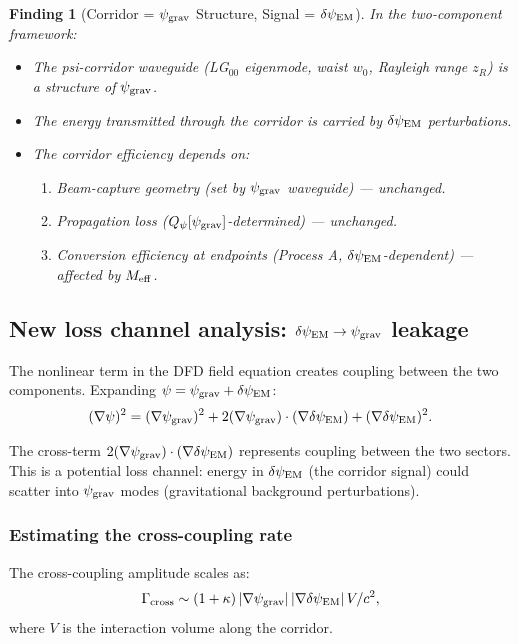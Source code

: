 \documentclass[11pt]{article}
\newtheorem{finding}{Finding}
\newcommand{\psigrav}{\psi_{\rm grav}}
\newcommand{\dpsiEM}{\delta\psi_{\rm EM}}
\newcommand{\Meff}{M_{\rm eff}}
\newcommand{\Qpsi}{Q_\psi}
\begin{document}
\begin{finding}[Corridor = $\psigrav$ Structure, Signal = $\dpsiEM$]
\label{find:corridor-decomposition}
In the two-component framework:
\begin{itemize}[nosep]
  \item The psi-corridor waveguide (LG$_{00}$ eigenmode, waist $w_0$,
    Rayleigh range $z_R$) is a structure of $\psigrav$.
  \item The energy transmitted through the corridor is carried by
    $\dpsiEM$ perturbations.
  \item The corridor efficiency depends on:
    \begin{enumerate}[nosep]
      \item Beam-capture geometry (set by $\psigrav$ waveguide) --- unchanged.
      \item Propagation loss ($\Qpsi[\psigrav]$-determined) --- unchanged.
      \item Conversion efficiency at endpoints (Process A, $\dpsiEM$-dependent)
        --- affected by $\Meff$.
    \end{enumerate}
\end{itemize}
\end{finding}

\subsection{New loss channel analysis: $\dpsiEM \to \psigrav$ leakage}
\label{sec:cross-coupling}

The nonlinear term in the DFD field equation creates coupling between
the two components. Expanding $\psi = \psigrav + \dpsiEM$:
\begin{equation}
(\nabla\psi)^2 = (\nabla\psigrav)^2 + 2(\nabla\psigrav)\cdot(\nabla\dpsiEM)
+ (\nabla\dpsiEM)^2.
\label{eq:gradient-squared}
\end{equation}

The cross-term $2(\nabla\psigrav)\cdot(\nabla\dpsiEM)$ represents coupling
between the two sectors. This is a potential loss channel: energy in
$\dpsiEM$ (the corridor signal) could scatter into $\psigrav$ modes
(gravitational background perturbations).

\subsubsection{Estimating the cross-coupling rate}

The cross-coupling amplitude scales as:
\begin{equation}
\Gamma_{\rm cross} \sim (1+\kappa)\,|\nabla\psigrav|\,|\nabla\dpsiEM|\,V/c^2,
\label{eq:cross-coupling}
\end{equation}
where $V$ is the interaction volume along the corridor.
\end{document}
